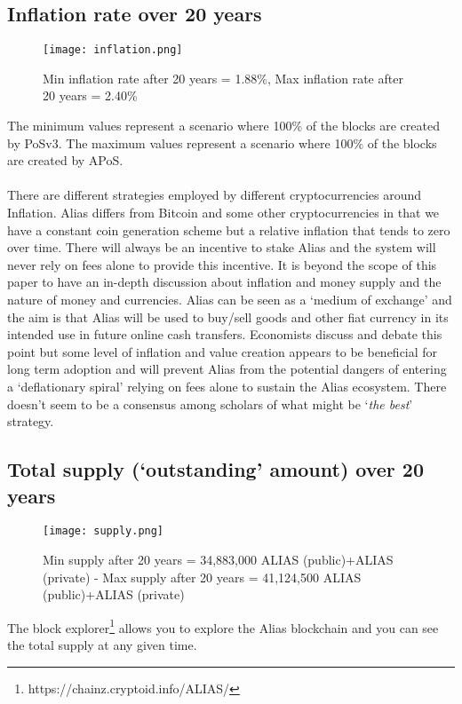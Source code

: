 \subsection{Inflation rate over 20 years}
\begin{figure}[h!]
	\centering
	\texttt{[image: inflation.png]}
	\caption{Min inflation rate after 20 years = 1.88\%, Max inflation 
	rate after 20 years = 2.40\% }
\end{figure}
\noindent
The minimum values represent a scenario where 100\% of the blocks
are created by PoSv3.
\linebreak
The maximum values represent a scenario where 100\%
of the blocks are created by APoS.
\\
\\
There are different strategies employed by different cryptocurrencies around
Inflation. Alias differs from Bitcoin and some other 
cryptocurrencies in that we have a constant coin generation scheme 
but a relative inflation that tends to zero over time. There will 
always be an incentive to stake Alias and the system will never 
rely on fees alone to provide this incentive. It is beyond the scope 
of this paper to have an in-depth discussion about inflation and money 
supply and the nature of money and currencies. Alias can be seen 
as a ‘medium of exchange’ and the aim is that Alias will be used 
to buy/sell goods and other fiat currency in its intended use in future 
online cash transfers. Economists discuss and debate this point but some 
level of inflation and value creation appears to be beneficial for long 
term adoption and will prevent Alias from the potential dangers of 
entering a ‘deflationary spiral’ relying on fees alone to sustain the 
Alias ecosystem. There doesn’t seem to be a consensus among 
scholars of what might be ‘\textit{the best}’ strategy.
\newpage

\subsection{Total supply (‘outstanding’ amount) over 20 years}
\begin{figure}[ht]
	\centering
	\texttt{[image: supply.png]}
	\caption{Min supply after 20 years = 34,883,000 ALIAS (public)+ALIAS (private) - Max 
		supply after 20 years = 41,124,500 ALIAS (public)+ALIAS (private)}
\end{figure}
\noindent
The block explorer\footnote{https://chainz.cryptoid.info/ALIAS/} allows you 
to explore the Alias blockchain and you can see the total supply at any given time.

